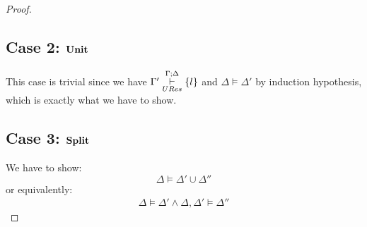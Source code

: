\begin{mytheorem}
\begin{proof}
\subsection*{Case 2: $\mathbf{Unit}$}
This case is trivial since we have $\Gamma'\overset{\Gamma;\Delta}{\underset{URes}{\vdash}} \{l \}$ and  $\Delta \models \Delta'$ by induction hypothesis, which is exactly what we have to show.
\subsection*{Case 3: $\mathbf{Split}$}


We have to show: $$ \Delta \models \Delta' \cup \Delta'' $$ or equivalently:
\begin{align*}
\Delta \models \Delta'  \wedge \Delta,\Delta' \models \Delta''
\end{align*}


\end{proof}
\end{mytheorem}

